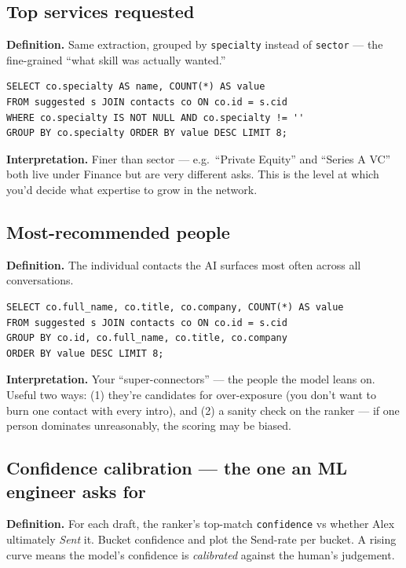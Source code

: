 \documentclass[11pt, a4paper]{article}
\begin{document}
\subsection{Top services requested}
\textbf{Definition.} Same extraction, grouped by \texttt{specialty} instead of \texttt{sector} --- the fine-grained ``what skill was actually wanted.''
\begin{lstlisting}[style=sql]
SELECT co.specialty AS name, COUNT(*) AS value
FROM suggested s JOIN contacts co ON co.id = s.cid
WHERE co.specialty IS NOT NULL AND co.specialty != ''
GROUP BY co.specialty ORDER BY value DESC LIMIT 8;
\end{lstlisting}
\textbf{Interpretation.} Finer than sector --- e.g.\ ``Private Equity'' and ``Series A VC'' both live under Finance but are very different asks. This is the level at which you'd decide what expertise to grow in the network.

\subsection{Most-recommended people}
\textbf{Definition.} The individual contacts the AI surfaces most often across all conversations.
\begin{lstlisting}[style=sql]
SELECT co.full_name, co.title, co.company, COUNT(*) AS value
FROM suggested s JOIN contacts co ON co.id = s.cid
GROUP BY co.id, co.full_name, co.title, co.company
ORDER BY value DESC LIMIT 8;
\end{lstlisting}
\textbf{Interpretation.} Your ``super-connectors'' --- the people the model leans on. Useful two ways: (1) they're candidates for over-exposure (you don't want to burn one contact with every intro), and (2) a sanity check on the ranker --- if one person dominates unreasonably, the scoring may be biased.

\subsection{Confidence calibration --- the one an ML engineer asks for}
\textbf{Definition.} For each draft, the ranker's top-match \texttt{confidence} vs whether Alex ultimately \emph{Sent} it. Bucket confidence and plot the Send-rate per bucket. A rising curve means the model's confidence is \emph{calibrated} against the human's judgement.
\end{document}

